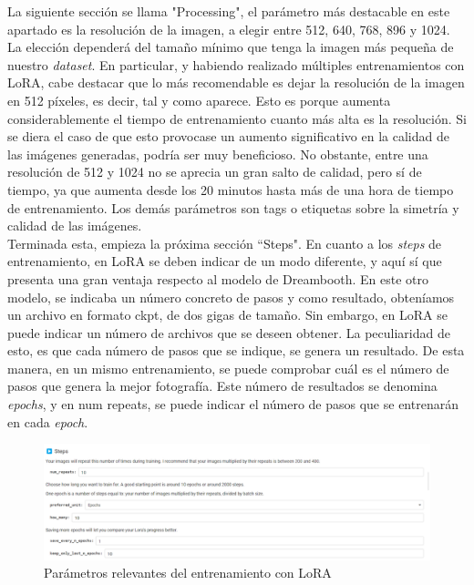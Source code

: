 La siguiente sección se llama "Processing", el parámetro más destacable en este apartado es la resolución de la imagen, a elegir entre 512, 640, 768, 896 y 1024. La elección dependerá del tamaño mínimo que tenga la imagen más pequeña de nuestro \textit{dataset}.  En particular, y habiendo realizado múltiples entrenamientos con LoRA, cabe destacar que lo más recomendable es dejar la resolución de la imagen en 512 píxeles, es decir, tal y como aparece. Esto es porque aumenta considerablemente el tiempo de entrenamiento cuanto más alta es la resolución. Si se diera el caso de que esto provocase un aumento significativo en la calidad de las imágenes generadas, podría ser muy beneficioso. No obstante, entre una resolución de 512 y 1024 no se aprecia un gran salto de calidad, pero sí de tiempo, ya que aumenta desde los 20 minutos hasta más de una hora de tiempo de entrenamiento. Los demás parámetros son tags o etiquetas sobre la simetría y calidad de las imágenes. \\

Terminada esta, empieza la próxima sección ``Steps".
En cuanto a los \textit{steps} de entrenamiento, en LoRA se deben indicar de un modo diferente, y aquí sí que presenta una gran ventaja respecto al modelo de Dreambooth. En este otro modelo, se indicaba un número concreto de pasos y como resultado, obteníamos un archivo en formato ckpt, de dos gigas de tamaño. Sin embargo, en LoRA se puede indicar un número de archivos que se deseen obtener. La peculiaridad de esto, es que cada número de pasos que se indique, se genera un resultado. De esta manera, en un mismo entrenamiento, se puede comprobar cuál es el número de pasos que genera la mejor fotografía. Este número de resultados se denomina \textit{epochs}, y en num repeats, se puede indicar el número de pasos que se entrenarán en cada \textit{epoch}. \\

\begin{figure}[h]
	\centering
	\includegraphics[width = 1.2
	\textwidth]{Imagenes/Vectorial/lora.png}
	\caption{Parámetros relevantes del entrenamiento con LoRA}
	\label{fig:lora}
\end{figure}

